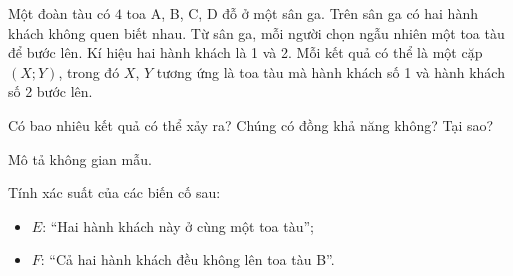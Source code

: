 \begin{practice}
\begin{questions}[resume=SBT]
        \item Một đoàn tàu có $4$ toa A, B, C, D đỗ ở một sân ga. Trên sân ga có hai hành khách không quen biết nhau. Từ sân ga, mỗi người chọn ngẫu nhiên một toa tàu để bước lên. Kí hiệu hai hành khách là 1 và 2. Mỗi kết quả có thể là một cặp $(X;Y)$, trong đó $X$, $Y$ tương ứng là toa tàu mà hành khách số 1 và hành khách số 2 bước lên.
        \begin{questions}
            \item Có bao nhiêu kết quả có thể xảy ra? Chúng có đồng khả năng không? Tại sao?
            \answerline
            \answerline
            \item Mô tả không gian mẫu.
            \answerline
            \answerline
            \item Tính xác suất của các biến cố sau:
            \begin{itemize}[label=+]
                \item $E$: “Hai hành khách này ở cùng một toa tàu”;
                \item $F$: “Cả hai hành khách đều không lên toa tàu B”.
            \end{itemize}
            \answerline
            \answerline
        \end{questions}
    \end{questions}
\end{practice}
